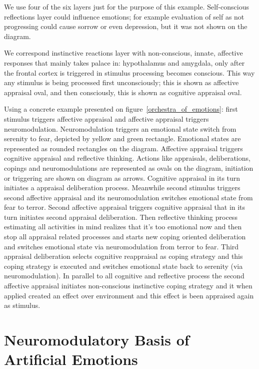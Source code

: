 We use four of the six layers just for the purpose of this example. Self-conscious reflections layer could influence emotions; for example evaluation of self as not progressing could cause sorrow or even depression, but it was not shown on the diagram.

We correspond instinctive reactions layer with non-conscious, innate, affective responses that mainly takes palace in: hypothalamus and amygdala, only after the frontal cortex is triggered in stimulus processing becomes conscious. This way any stimulus is being processed first unconsciously; this is shown as affective appraisal oval, and then consciously, this is shown as cognitive appraisal oval.

Using a concrete example presented on figure~\ref{orchestra_of_emotions}: first stimulus triggers affective appraisal and affective appraisal triggers neuromodulation. Neuromodulation triggers an emotional state switch from serenity to fear, depicted by yellow and green rectangle. Emotional states are represented as rounded rectangles on the diagram. Affective appraisal triggers cognitive appraisal and reflective thinking. Actions like appraisals, deliberations, copings and neuromodulations are represented as ovals on the diagram, initiation or triggering are shown on diagram as arrows. Cognitive appraisal in its turn initiates a appraisal deliberation process. Meanwhile second stimulus triggers second affective appraisal and its neuromodulation switches emotional state from fear to terror. Second affective appraisal triggers cognitive appraisal that in its turn initiates second appraisal deliberation. Then reflective thinking process estimating all activities in mind realizes that it's too emotional now and then stop all appraisal related processes and starts new coping oriented deliberation and switches emotional state via neuromodulation from terror to fear. Third appraisal deliberation selects cognitive reappraisal as coping strategy and this coping strategy is executed and switches emotional state back to serenity (via neuromodulation).
In parallel to all cognitive and reflective process the second affective appraisal initiates non-conscious instinctive coping strategy and it when applied created an effect over environment and this effect is been appraised again as stimulus.

\section{Neuromodulatory Basis of Artificial Emotions}

